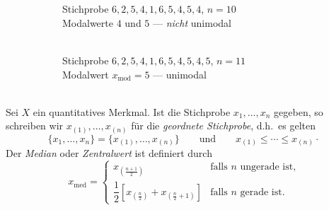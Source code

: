 \begin{bsp}[Würfeln]
     \\
    \begin{figure}[H]
        \begin{subfigure}[t]{0.48\textwidth}
            \centering
            \\
            \footnotesize Stichprobe $6,2,5,4,1,6,5,4,5,4$, $n=10$\\
            Modalwerte $4$ und $5$ --- \emph{nicht} unimodal
        \end{subfigure}
        \hfill
        \begin{subfigure}[t]{0.48\textwidth}
            \centering
            \\
            \footnotesize Stichprobe $6,2,5,4,1,6,5,4,5,4,5$, $n=11$\\
            Modalwert $x_{\mathrm{mod}}=5$ --- unimodal
        \end{subfigure}\label{fig:figure7}
    \end{figure}
\end{bsp}

\begin{defi}
     \\
    Sei $X$ ein quantitatives \gls{Merkmal}.
    Ist die Stichprobe $x_1,\dots,x_n$ gegeben, so schreiben wir $x_{(1)},\dots,x_{(n)}$ für die \emph{geordnete Stichprobe}, d.h.\ es gelten
    \[
        \{x_1,\dots,x_n\} = \{x_{(1)},\dots,x_{(n)}\} \qquad\text{und}\qquad x_{(1)}\leq\cdots\leq x_{(n)} \cdot
    \]
    Der \emph{Median} oder \emph{Zentralwert} ist definiert durch
    \[
        x_{\mathrm{med}} =
        \begin{cases}
            x_{\left(\frac{n+1}{2}\right)} & \text{falls } n \text{ ungerade ist,}\\[1ex]
            \dfrac12\left[x_{\left(\frac n2\right)} + x_{\left(\frac n2+1\right)}\right] & \text{falls } n \text{ gerade ist.}
        \end{cases}
    \]
\end{defi}

